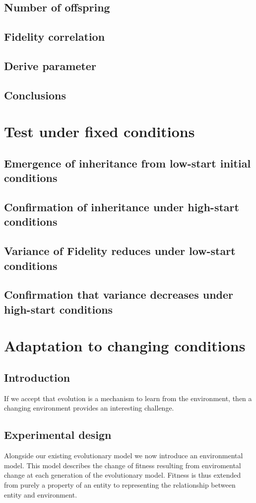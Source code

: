 \documentclass[]{report}
\begin{document}
\section{Number of offspring}
\section{Fidelity correlation}
\section{Derive parameter}
\section{Conclusions}

\chapter{Test under fixed conditions}
\section{Emergence of inheritance from low-start initial conditions}
\section{Confirmation of inheritance under high-start conditions}
\section{Variance of Fidelity reduces under low-start conditions}
\section{Confirmation that variance decreases under high-start conditions}

\chapter{Adaptation to changing conditions}
\section{Introduction}
If we accept that evolution is a mechanism to learn from the environment, then a changing environment provides an interesting challenge. 
\section{Experimental design}
Alongside our existing evolutionary model we now introduce an environmental model. This model describes the change of fitness resulting from enviromental change at each generation of the evolutionary model. Fitness is thus extended from purely a property of an entity to representing the relationship between entity and environment.
\end{document}
